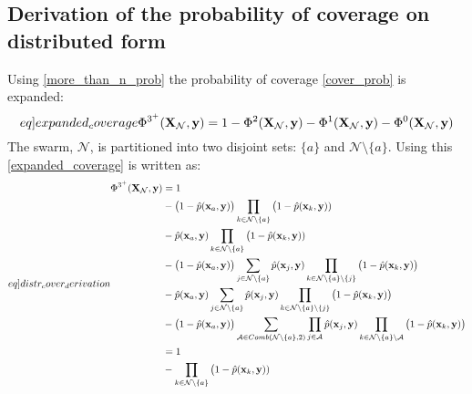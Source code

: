 \begin{appendices}
  \stoptocwriting
  \section{Derivation of the probability of coverage on distributed form}\label{appendix:derivations}

  Using \eqref{more_than_n_prob} the probability of coverage \eqref{cover_prob} is expanded:
  \begin{equation}\label[eq]{expanded_coverage}
    \Phi^{3^{+}}(\mathbf{X}_{\mathcal{N}}, \mathbf{y}) = 1 - \Phi^{2}(\mathbf{X}_{\mathcal{N}}, \mathbf{y}) - \Phi^{1}(\mathbf{X}_{\mathcal{N}}, \mathbf{y}) - \Phi^{0}(\mathbf{X}_{\mathcal{N}}, \mathbf{y})
  \end{equation}
  The swarm, $\mathcal{N}$, is partitioned into two disjoint sets: $\{a\}$ and $\mathcal{N}\setminus\{a\}$. 
  Using this \eqref{expanded_coverage} is written as:
  \begin{equation}\label[eq]{distr_cover_derivation}
    \begin{split}
      \Phi^{3^{+}}(\mathbf{X}_{\mathcal{N}}, \mathbf{y}) &= 1\\
      &- \big(1-\hat{p}(\mathbf{x}_{a}, \mathbf{y})\big)\prod_{k\in\mathcal{N}\setminus\{a\}}\big(1-\hat{p}(\mathbf{x}_{k}, \mathbf{y}))\\
      &- \hat{p}(\mathbf{x}_{a}, \mathbf{y})\prod_{k\in\mathcal{N}\setminus\{a\}}\big(1-\hat{p}(\mathbf{x}_{k}, \mathbf{y}))\\
      &- \big(1-\hat{p}(\mathbf{x}_{a}, \mathbf{y})\big)\sum_{j\in\mathcal{N}\setminus\{a\}}\hat{p}(\mathbf{x}_{j}, \mathbf{y})\prod_{k\in\mathcal{N}\setminus\{a\}\setminus\{j\}}\big(1-\hat{p}(\mathbf{x}_{k}, \mathbf{y})\big)\\
      &- \hat{p}(\mathbf{x}_{a}, \mathbf{y})\sum_{j\in \mathcal{N}\setminus\{a\}}\hat{p}(\mathbf{x}_{j}, \mathbf{y})\prod_{k\in\mathcal{N}\setminus\{a\}\setminus\{j\}}\big(1-\hat{p}(\mathbf{x}_{k}, \mathbf{y})\big)\\
      &- \big(1-\hat{p}(\mathbf{x}_{a}, \mathbf{y})\big)\sum_{\mathcal{A}\in Comb(\mathcal{N}\setminus\{a\}, 2)}\prod_{j\in\mathcal{A}}\hat{p}(\mathbf{x}_{j}, \mathbf{y})\prod_{k\in\mathcal{N}\setminus\{a\}\setminus\mathcal{A}}\big(1-\hat{p}(\mathbf{x}_{k}, \mathbf{y})\big)\\
      &= 1\\
      &- \prod_{k\in\mathcal{N}\setminus\{a\}}\big(1-\hat{p}(\mathbf{x}_{k}, \mathbf{y}))\\

\end{split}
\end{equation}
\end{appendices}
